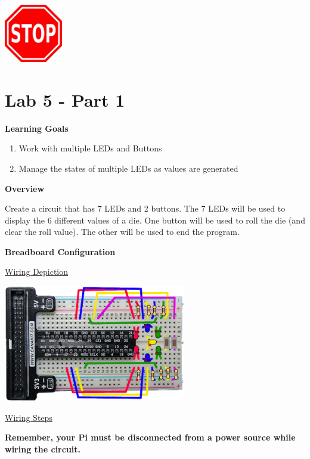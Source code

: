{\centering
	\beforefig
	\centerline{\includegraphics[height=1in]{pi_images/stop_sign_clip_art_16252.jpg}}
	\afterfig
}

\newpage

\section{Lab 5 - Part 1}

\textbf{Learning Goals}

\begin{enumerate}
	\item Work with multiple LEDs and Buttons
	\item Manage the states of multiple LEDs as values are generated
\end{enumerate}

\textbf{Overview}

Create a circuit that has 7 LEDs and 2 buttons. The 7 LEDs will be used to display the 6 different values of a die. One button will be used to roll the die (and clear the roll value). The other will be used to end the program.

\textbf{Breadboard Configuration}

\underline{Wiring Depiction}

\beforefig
\centerline{\includegraphics[height=2in]{pi_images/lab05images/PiLab05-DieLight.png}}
\afterfig

\underline{Wiring Steps}

\textbf{Remember, your Pi must be disconnected from a power source while wiring the circuit.}

